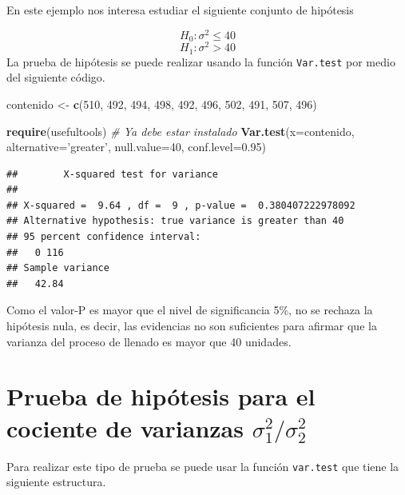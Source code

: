 \documentclass[10pt,]{krantz}
\makeatletter
\newenvironment{Shaded}{\begin{snugshade}}{\end{snugshade}}
\newcommand{\KeywordTok}[1]{\textcolor[rgb]{0.13,0.29,0.53}{\textbf{#1}}}
\newcommand{\DataTypeTok}[1]{\textcolor[rgb]{0.13,0.29,0.53}{#1}}
\newcommand{\DecValTok}[1]{\textcolor[rgb]{0.00,0.00,0.81}{#1}}
\newcommand{\FloatTok}[1]{\textcolor[rgb]{0.00,0.00,0.81}{#1}}
\newcommand{\StringTok}[1]{\textcolor[rgb]{0.31,0.60,0.02}{#1}}
\newcommand{\CommentTok}[1]{\textcolor[rgb]{0.56,0.35,0.01}{\textit{#1}}}
\newcommand{\NormalTok}[1]{#1}
\newenvironment{kframe}{%
\medskip{}
\setlength{\fboxsep}{.8em}
 \def\at@end@of@kframe{}%
 \ifinner\ifhmode%
  \def\at@end@of@kframe{\end{minipage}}%
  \begin{minipage}{\columnwidth}%
 \fi\fi%
 \def\FrameCommand##1{\hskip\@totalleftmargin \hskip-\fboxsep
 \colorbox{shadecolor}{##1}\hskip-\fboxsep
     \hskip-\linewidth \hskip-\@totalleftmargin \hskip\columnwidth}%
 \MakeFramed {\advance\hsize-\width
   \@totalleftmargin\z@ \linewidth\hsize
   \@setminipage}}%
 {\par\unskip\endMakeFramed%
 \at@end@of@kframe}
\renewenvironment{Shaded}{\begin{kframe}}{\end{kframe}}
\makeatother
\begin{document}
En este ejemplo nos interesa estudiar el siguiente conjunto de hipótesis

\[H_0: \sigma^2 \leq 40\] \[H_1: \sigma^2 > 40\] La prueba de hipótesis
se puede realizar usando la función \texttt{Var.test} por medio del
siguiente código.

\begin{Shaded}
\begin{Highlighting}[]
\NormalTok{contenido <-}\StringTok{ }\KeywordTok{c}\NormalTok{(}\DecValTok{510}\NormalTok{, }\DecValTok{492}\NormalTok{, }\DecValTok{494}\NormalTok{, }\DecValTok{498}\NormalTok{, }\DecValTok{492}\NormalTok{,}
               \DecValTok{496}\NormalTok{, }\DecValTok{502}\NormalTok{, }\DecValTok{491}\NormalTok{, }\DecValTok{507}\NormalTok{, }\DecValTok{496}\NormalTok{)}

\KeywordTok{require}\NormalTok{(usefultools)  }\CommentTok{# Ya debe estar instalado}
\KeywordTok{Var.test}\NormalTok{(}\DataTypeTok{x=}\NormalTok{contenido, }\DataTypeTok{alternative=}\StringTok{'greater'}\NormalTok{,}
         \DataTypeTok{null.value=}\DecValTok{40}\NormalTok{, }\DataTypeTok{conf.level=}\FloatTok{0.95}\NormalTok{)}
\end{Highlighting}
\end{Shaded}

\begin{verbatim}
##        X-squared test for variance   
## 
## X-squared =  9.64 , df =  9 , p-value =  0.380407222978092 
## Alternative hypothesis: true variance is greater than 40 
## 95 percent confidence interval: 
##   0 116 
## Sample variance 
##   42.84
\end{verbatim}

Como el valor-P es mayor que el nivel de significancia 5\%, no se
rechaza la hipótesis nula, es decir, las evidencias no son suficientes
para afirmar que la varianza del proceso de llenado es mayor que 40
unidades.

\section{\texorpdfstring{Prueba de hipótesis para el cociente de
varianzas
\(\sigma_1^2 / \sigma_2^2\)}{Prueba de hipótesis para el cociente de varianzas \textbackslash{}sigma\_1\^{}2 / \textbackslash{}sigma\_2\^{}2}}\label{prueba-de-hipotesis-para-el-cociente-de-varianzas-sigma_12-sigma_22}

Para realizar este tipo de prueba se puede usar la función
\texttt{var.test} que tiene la siguiente estructura.
\end{document}
